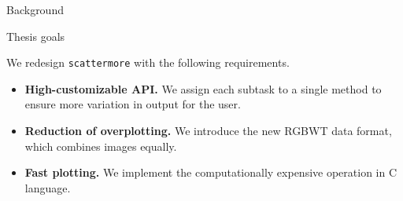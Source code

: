 \documentclass[portrait,a0paper,fontscale=0.25]{baposter}
\begin{document}
\begin{poster}
\begin{posterbox}[column=0,name=background,
headerColorOne=red!60, boxColorOne=red!20]{Background}
\begin{center}
{}
\hfill
{}
\hfill
{}
\end{center}

\end{posterbox}

\begin{posterbox}[column=0, name=goals, below=background, headerColorOne=cyan!60, boxColorOne=cyan!20]{Thesis goals}

We redesign \texttt{scattermore} with the following requirements.

\begin{itemize}
\item \textbf{High-customizable API.} We assign each subtask to a single method to ensure more variation in output for the user.
\item \textbf{Reduction of overplotting.} We introduce the new RGBWT data format, which combines images equally.
\item \textbf{Fast plotting.} We implement the computationally expensive operation in C language.
\end{itemize}


\end{posterbox}
\end{poster}
\end{document}
